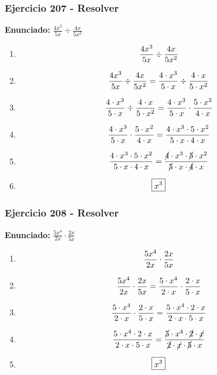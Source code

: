 \documentclass[11pt,a4paper]{article}
\newcommand{\fitmath}[1]{%
\[
\setbox0=\hbox{$\displaystyle #1$}%
\ifdim\wd0>\linewidth
\resizebox{\linewidth}{!}{$\displaystyle #1$}%
\else
#1%
\fi
\]
}
\begin{document}
\vspace{0.12cm}
\subsubsection*{Ejercicio 207 - Resolver}
\textbf{Enunciado:} $ \frac{4 x^{3}}{5 x} \div \frac{4 x}{5 x^{2}} $\par
\begin{enumerate}[leftmargin=2em]
\item \fitmath{\frac{4 x^{3}}{5 x} \div \frac{4 x}{5 x^{2}}}
\item \fitmath{\frac{4 x^{3}}{5 x} \div \frac{4 x}{5 x^{2}}= \frac{4\cdot x^{3}}{5\cdot x} \div \frac{4\cdot x}{5\cdot x^{2}}}
\item \fitmath{\frac{4\cdot x^{3}}{5\cdot x}\div \frac{4\cdot x}{5\cdot x^{2}}= \frac{4\cdot x^{3}}{5\cdot x}\cdot \frac{5\cdot x^{2}}{4\cdot x}}
\item \fitmath{\frac{4\cdot x^{3}}{5\cdot x}\cdot \frac{5\cdot x^{2}}{4\cdot x}= \frac{4\cdot x^{3}\cdot 5\cdot x^{2}}{5\cdot x\cdot 4\cdot x}}
\item \fitmath{\frac{4\cdot x^{3}\cdot 5\cdot x^{2}}{5\cdot x\cdot 4\cdot x}= \frac{\cancel{4}\cdot x^{3}\cdot \cancel{5}\cdot x^{2}}{\cancel{5}\cdot x\cdot \cancel{4}\cdot x}}
\item \fitmath{\boxed{x^{3}}}
\end{enumerate}

\vspace{0.12cm}
\subsubsection*{Ejercicio 208 - Resolver}
\textbf{Enunciado:} $ \frac{5 x^{4}}{2 x} \cdot \frac{2 x}{5 x} $\par
\begin{enumerate}[leftmargin=2em]
\item \fitmath{\frac{5 x^{4}}{2 x} \cdot \frac{2 x}{5 x}}
\item \fitmath{\frac{5 x^{4}}{2 x} \cdot \frac{2 x}{5 x}= \frac{5\cdot x^{4}}{2\cdot x} \cdot \frac{2\cdot x}{5\cdot x}}
\item \fitmath{\frac{5\cdot x^{4}}{2\cdot x}\cdot \frac{2\cdot x}{5\cdot x}= \frac{5\cdot x^{4}\cdot 2\cdot x}{2\cdot x\cdot 5\cdot x}}
\item \fitmath{\frac{5\cdot x^{4}\cdot 2\cdot x}{2\cdot x\cdot 5\cdot x}= \frac{\cancel{5}\cdot x^{4}\cdot \cancel{2}\cdot \cancel{x}}{\cancel{2}\cdot \cancel{x}\cdot \cancel{5}\cdot x}}
\item \fitmath{\boxed{x^{3}}}
\end{enumerate}
\end{document}
